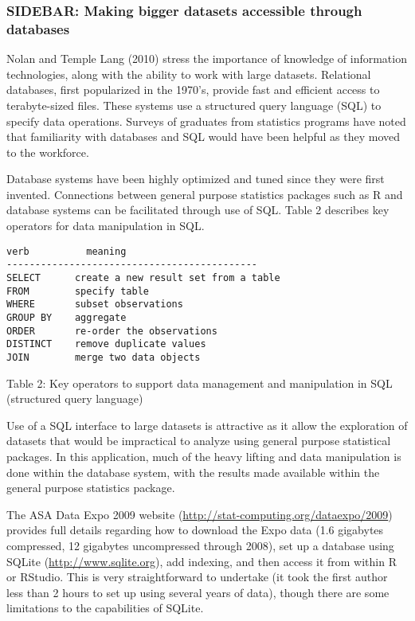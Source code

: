 \documentclass[]{article}
\begin{document}
\subsubsection{SIDEBAR: Making bigger datasets accessible through
databases}\label{sidebar-making-bigger-datasets-accessible-through-databases}

Nolan and Temple Lang (2010) stress the importance of knowledge of
information technologies, along with the ability to work with large
datasets. Relational databases, first popularized in the 1970's, provide
fast and efficient access to terabyte-sized files. These systems use a
structured query language (SQL) to specify data operations. Surveys of
graduates from statistics programs have noted that familiarity with
databases and SQL would have been helpful as they moved to the
workforce.

Database systems have been highly optimized and tuned since they were
first invented. Connections between general purpose statistics packages
such as R and database systems can be facilitated through use of SQL.
Table 2 describes key operators for data manipulation in SQL.

\begin{verbatim}
verb          meaning
--------------------------------------------
SELECT      create a new result set from a table
FROM        specify table
WHERE       subset observations
GROUP BY    aggregate
ORDER       re-order the observations
DISTINCT    remove duplicate values
JOIN        merge two data objects
\end{verbatim}

Table 2: Key operators to support data management and manipulation in
SQL (structured query language)

Use of a SQL interface to large datasets is attractive as it allow the
exploration of datasets that would be impractical to analyze using
general purpose statistical packages. In this application, much of the
heavy lifting and data manipulation is done within the database system,
with the results made available within the general purpose statistics
package.

The ASA Data Expo 2009 website
(\url{http://stat-computing.org/dataexpo/2009}) provides full details
regarding how to download the Expo data (1.6 gigabytes compressed, 12
gigabytes uncompressed through 2008), set up a database using SQLite
(\url{http://www.sqlite.org}), add indexing, and then access it from
within R or RStudio. This is very straightforward to undertake (it took
the first author less than 2 hours to set up using several years of
data), though there are some limitations to the capabilities of SQLite.
\end{document}
